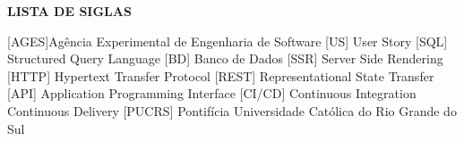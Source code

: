 
\begin{center}
  \uppercase{\bfseries lista de siglas}\\[3em]
\end{center}

\begin{acronym}[XXXXXXXX]
  [AGES]{Agência Experimental de Engenharia de Software}
   [US] {User Story}
   [SQL] {Structured Query Language}
   [BD] {Banco de Dados}
   [SSR] {Server Side Rendering}
   [HTTP] {Hypertext Transfer Protocol}
   [REST] {Representational State Transfer}
   [API] {Application Programming Interface}
   [CI/CD] {Continuous Integration Continuous Delivery}
   [PUCRS] {Pontifícia Universidade Católica do Rio Grande do Sul}
\end{acronym}